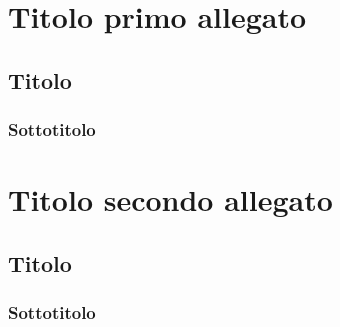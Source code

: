 \chapter{Titolo primo allegato}

\section{Titolo}

\subsection{Sottotitolo}

\chapter{Titolo secondo allegato}

\section{Titolo}

\subsection{Sottotitolo}
